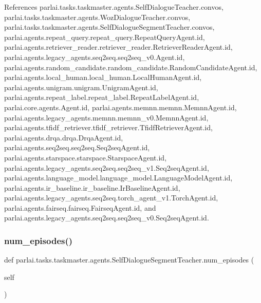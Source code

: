 References parlai.\+tasks.\+taskmaster.\+agents.\+Self\+Dialogue\+Teacher.\+convos, parlai.\+tasks.\+taskmaster.\+agents.\+Woz\+Dialogue\+Teacher.\+convos, parlai.\+tasks.\+taskmaster.\+agents.\+Self\+Dialogue\+Segment\+Teacher.\+convos, parlai.\+agents.\+repeat\+\_\+query.\+repeat\+\_\+query.\+Repeat\+Query\+Agent.\+id, parlai.\+agents.\+retriever\+\_\+reader.\+retriever\+\_\+reader.\+Retriever\+Reader\+Agent.\+id, parlai.\+agents.\+legacy\+\_\+agents.\+seq2seq.\+seq2seq\+\_\+v0.\+Agent.\+id, parlai.\+agents.\+random\+\_\+candidate.\+random\+\_\+candidate.\+Random\+Candidate\+Agent.\+id, parlai.\+agents.\+local\+\_\+human.\+local\+\_\+human.\+Local\+Human\+Agent.\+id, parlai.\+agents.\+unigram.\+unigram.\+Unigram\+Agent.\+id, parlai.\+agents.\+repeat\+\_\+label.\+repeat\+\_\+label.\+Repeat\+Label\+Agent.\+id, parlai.\+core.\+agents.\+Agent.\+id, parlai.\+agents.\+memnn.\+memnn.\+Memnn\+Agent.\+id, parlai.\+agents.\+legacy\+\_\+agents.\+memnn.\+memnn\+\_\+v0.\+Memnn\+Agent.\+id, parlai.\+agents.\+tfidf\+\_\+retriever.\+tfidf\+\_\+retriever.\+Tfidf\+Retriever\+Agent.\+id, parlai.\+agents.\+drqa.\+drqa.\+Drqa\+Agent.\+id, parlai.\+agents.\+seq2seq.\+seq2seq.\+Seq2seq\+Agent.\+id, parlai.\+agents.\+starspace.\+starspace.\+Starspace\+Agent.\+id, parlai.\+agents.\+legacy\+\_\+agents.\+seq2seq.\+seq2seq\+\_\+v1.\+Seq2seq\+Agent.\+id, parlai.\+agents.\+language\+\_\+model.\+language\+\_\+model.\+Language\+Model\+Agent.\+id, parlai.\+agents.\+ir\+\_\+baseline.\+ir\+\_\+baseline.\+Ir\+Baseline\+Agent.\+id, parlai.\+agents.\+legacy\+\_\+agents.\+seq2seq.\+torch\+\_\+agent\+\_\+v1.\+Torch\+Agent.\+id, parlai.\+agents.\+fairseq.\+fairseq.\+Fairseq\+Agent.\+id, and parlai.\+agents.\+legacy\+\_\+agents.\+seq2seq.\+seq2seq\+\_\+v0.\+Seq2seq\+Agent.\+id.

\mbox{\label{classparlai_1_1tasks_1_1taskmaster_1_1agents_1_1SelfDialogueSegmentTeacher_ac6074b82541ad78c9a4306877aff0764}} 
\subsubsection{\texorpdfstring{num\+\_\+episodes()}{num\_episodes()}}
{\footnotesize\ttfamily def parlai.\+tasks.\+taskmaster.\+agents.\+Self\+Dialogue\+Segment\+Teacher.\+num\+\_\+episodes (\begin{DoxyParamCaption}\item[{}]{self }\end{DoxyParamCaption})}




